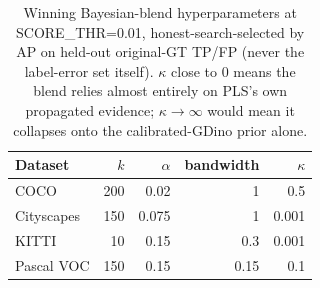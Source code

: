 \begin{table}[t]
\centering
\caption{Winning Bayesian-blend hyperparameters at SCORE\_THR=0.01, honest-search-selected by AP on held-out original-GT TP/FP (never the label-error set itself). $\kappa$ close to 0 means the blend relies almost entirely on PLS's own propagated evidence; $\kappa \to \infty$ would mean it collapses onto the calibrated-GDino prior alone.}
\label{tab:label_error_detection_hyperparams_thr001}
\begin{tabular}{lrrrr}
\toprule
Dataset & $k$ & $\alpha$ & bandwidth & $\kappa$ \\
\midrule
COCO & 200 & 0.02 & 1 & 0.5 \\
Cityscapes & 150 & 0.075 & 1 & 0.001 \\
KITTI & 10 & 0.15 & 0.3 & 0.001 \\
Pascal VOC & 150 & 0.15 & 0.15 & 0.1 \\
\bottomrule
\end{tabular}
\end{table}
